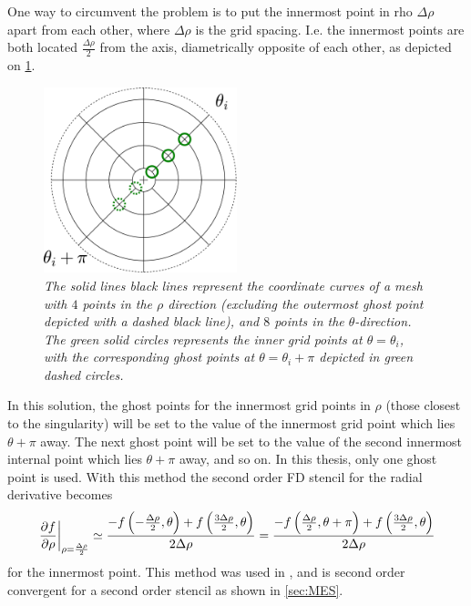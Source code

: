One way to circumvent the problem is to put the innermost point in rho $\Delta \rho$ apart from each other, where $\Delta \rho$ is the grid spacing.
I.e. the innermost points are both located $\frac{\Delta \rho}{2}$ from the axis, diametrically opposite of each other, as depicted on \cref{fig:innerRho}.
%
\begin{figure}[htb]
    \centering
    \includegraphics[width=0.5\textwidth]{fig/innerGhost}
    \caption{\textit{
The solid lines black lines represent the coordinate curves of a mesh with $4$ points in the $\rho$ direction (excluding the outermost ghost point depicted with a dashed black line), and $8$ points in the $\theta$-direction.
The green solid circles represents the inner grid points at $\theta=\theta_i$, with the corresponding ghost points at $\theta=\theta_i + \pi$ depicted in green dashed circles.
    }}
    \label{fig:innerRho}
\end{figure}
%
In this solution, the ghost points for the innermost grid points in $\rho$ (those closest to the singularity) will be set to the value of the innermost grid point which lies $\theta + \pi$ away.
The next ghost point will be set to the value of the second innermost internal point which lies $\theta + \pi$ away, and so on.
In this thesis, only one ghost point is used.
With this method the second order FD stencil for the radial derivative becomes
%
\begin{align*}
    \left.\frac{\partial {f}}{\partial{\rho}}\right|_{\rho=\frac{\Delta \rho}{2}} \simeq
    \frac{-f\left(-\frac{\Delta \rho}{2}, \theta\right) + f\left(\frac{3\Delta \rho}{2}, \theta\right)}{2\Delta \rho}
    =
    \frac{-f\left(\frac{\Delta \rho}{2}, \theta+\pi\right) + f\left(\frac{3\Delta \rho}{2}, \theta\right)}{2\Delta \rho}
\end{align*}
%
for the innermost point.
This method was used in \cite{Naulin2008}, and is second order convergent for a second order stencil as shown in \cref{sec:MES}.

